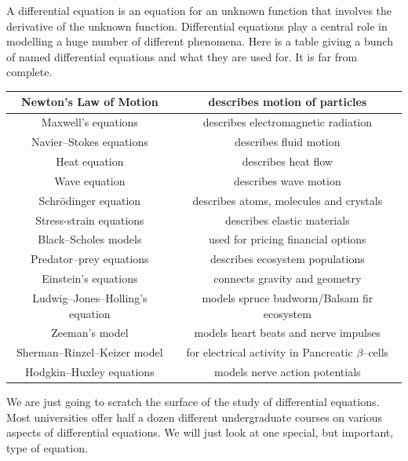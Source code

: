 A differential equation is an equation for an unknown function that
involves the derivative of the unknown function. Differential equations
play a central role in modelling a huge number of different phenomena.
Here is a table giving a bunch of named differential equations and what
they are used for. It is far from complete.

\begin{center}
\renewcommand{\arraystretch}{1.4}
     \begin{tabular}{|c|c|}
        \hline
  Newton's Law of Motion
      & describes motion of particles \\ \hline
  Maxwell's equations
      &describes electromagnetic radiation \\ \hline
  Navier--Stokes equations
      &describes fluid motion \\ \hline
  Heat equation
      &describes heat flow \\ \hline
  Wave equation
      &describes wave motion \\ \hline
  Schr\"odinger equation
      &describes atoms, molecules and crystals \\ \hline
  Stress-strain equations
      &describes elastic materials \\ \hline
  Black--Scholes models
      &used for pricing financial options \\ \hline
  Predator--prey equations
      &describes ecosystem populations  \\ \hline
  Einstein's equations
      &connects gravity and geometry  \\ \hline
  Ludwig--Jones--Holling's equation
      &models spruce budworm/Balsam fir ecosystem  \\ \hline
  Zeeman's model
      &models heart beats and nerve impulses \\ \hline
  Sherman--Rinzel--Keizer model
      &for electrical activity in Pancreatic $\beta$--cells  \\ \hline
  Hodgkin--Huxley equations
      &models nerve action potentials  \\
  \hline
     \end{tabular}
\renewcommand{\arraystretch}{1.0}
\end{center}

We are just going to scratch the surface of the study of differential
equations. Most universities offer half a dozen different undergraduate
courses on various aspects of differential equations. We will just look
at one special, but important, type of equation.

